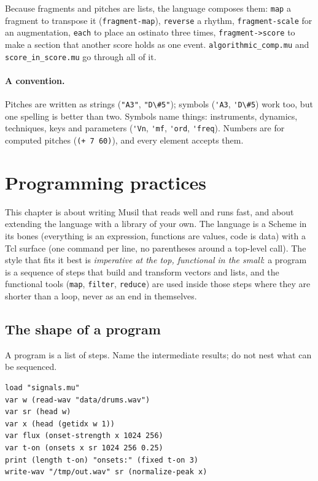 \documentclass[11pt,a4paper]{article}
\newcommand{\musil}[1]{\lstinline[style=musilinline]{#1}}
\begin{document}
Because fragments and pitches are lists, the language composes them: \musil{map} a
fragment to transpose it (\musil{fragment-map}), \musil{reverse} a rhythm,
\musil{fragment-scale} for an augmentation, \musil{each} to place an ostinato three times,
\musil{fragment->score} to make a section that another score holds as one event.
\texttt{algorithmic\_comp.mu} and \texttt{score\_in\_score.mu} go through all of it.

\paragraph{A convention.} Pitches are written as strings (\musil{"A3"}, \musil{"D\#5"}); symbols
(\musil{'A3}, \musil{'D\#5}) work too, but one spelling is better than two. Symbols name things: instruments, dynamics, techniques, keys and parameters
(\musil{'Vn}, \musil{'mf}, \musil{'ord}, \musil{'freq}). Numbers are for computed pitches
(\musil{(+ 7 60)}), and every element accepts them.

\section{Programming practices}
\label{sec:practices}

This chapter is about writing Musil that reads well and runs fast, and about extending
the language with a library of your own. The language is a Scheme in its bones
(everything is an expression, functions are values, code is data) with a Tcl surface (one
command per line, no parentheses around a top-level call). The style that fits it best is
\emph{imperative at the top, functional in the small}: a program is a sequence of steps
that build and transform vectors and lists, and the functional tools (\musil{map},
\musil{filter}, \musil{reduce}) are used inside those steps where they are shorter than a
loop, never as an end in themselves.

\subsection{The shape of a program}

A program is a list of steps. Name the intermediate results; do not nest what can be
sequenced.

\begin{lstlisting}
load "signals.mu"
var w (read-wav "data/drums.wav")
var sr (head w)
var x (head (getidx w 1))
var flux (onset-strength x 1024 256)
var t-on (onsets x sr 1024 256 0.25)
print (length t-on) "onsets:" (fixed t-on 3)
write-wav "/tmp/out.wav" sr (normalize-peak x)
\end{lstlisting}
\end{document}
